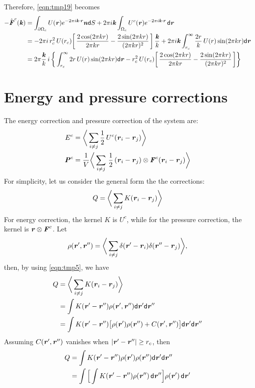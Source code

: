 \documentclass[aps,pre,preprint]{revtex4}
\renewcommand{\v}[1]{\textbf{\textit{#1}}}
\renewcommand{\d}[1]{\textsf{#1}}
\begin{document}
Therefore, \eqref{eqn:tmp19} becomes
\begin{align}\nonumber
  -\hat{\v F}^c(\v k) 
  & =
  \int_{\partial\Omega_c}U(\v r) e^{-2\pi i\v k\cdot\v r} \v n\d dS
  + 2\pi i \v k\int_{\Omega_c} U^c(\v r) e^{-2\pi i\v k\cdot\v r}\,\d d\v r\\ \nonumber
  & = 
  -2\pi i\, r_c^2\,U(r_c)
  \bigg[\,
  \frac{2\cos(2\pi kr)}{2\pi kr}
  -\frac{2\sin(2\pi kr)}{(2\pi kr)^2}
  \,\bigg] \,\frac{\v k}k +
  2\pi i \v k
  \int_{r_c}^\infty \frac{2r}k\,U(r)\sin(2\pi kr)\d d\v r \\
  & =
  2\pi\frac{\v k}k\, i\,
  \bigg\{
  \int_{r_c}^\infty 2r\,U(r)\sin(2\pi kr)\d d\v r
  - r_c^2\,U(r_c)
  \bigg[\,
  \frac{2\cos(2\pi kr)}{2\pi kr}
  -\frac{2\sin(2\pi kr)}{(2\pi kr)^2}
  \,\bigg] 
  \bigg\}
\end{align}



\section{Energy and pressure corrections}
The energy correction and pressure correction of the system are:
\begin{align}
  E^c &= \bigg\langle \sum_{i\neq j} \frac12 \,U^c(\v r_i - \v r_j) \bigg\rangle\\
  \v P^c &= \frac1{V} \bigg\langle \sum_{i\neq j}\,\frac12\, (\v r_i - \v r_j) \otimes \v F^c(\v r_i - \v r_j) \bigg\rangle
\end{align}
For simplicity, let us consider the general form the the corrections:
\begin{align}
  Q = \bigg\langle \sum_{i\neq j} K(\v r_i - \v r_j) \bigg\rangle
\end{align}
For energy correction, the kernel $K$ is $U^c$, while for the pressure
correction, the kernel is $\v r\otimes\v F^c$.
Let
\begin{align}
  \rho(\v r', \v r'') =
  \bigg\langle
  \sum_{i\neq j}\delta(\v r' - \v r_i)\delta(\v r'' - \v r_j)
  \bigg\rangle,
\end{align}
then, by using \eqref{eqn:tmp5}, we have 
\begin{align}\nonumber
  Q
  &= \bigg\langle \sum_{i\neq j} K(\v r_i - \v r_j) \bigg\rangle\\\nonumber
  & = \int K(\v r' - \v r'') \rho(\v r', \v r'') \d d\v r'\d d\v r'' \\\nonumber
  & = \int K(\v r' - \v r'')
  \big[
  \rho(\v r') \rho(\v r'') + C(\v r', \v r'')
  \big]
  \d d\v r'\d d\v r''
\end{align}
Assuming $C(\v r', \v r'')$ vanishes when $\vert\v r' - \v r''\vert \geq r_c$, then
\begin{align} \nonumber
  Q 
  & = \int K(\v r' - \v r'')
  \rho(\v r') \rho(\v r'') 
  \d d\v r'\d d\v r'' \\
  & = \int
  \Big[
  \int K(\v r' - \v r'') \rho(\v r'')\,\d d\v r''
  \Big]
  \rho(\v r')\,\d d\v r'
\end{align}
\end{document}
